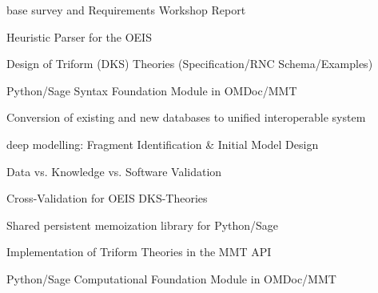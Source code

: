 \begin{workpackage}[id=dksbases,%
  title=Dks/Knowledge/Software-Bases,lead=JU,
  ZHRM=12,JURM=36,USHRM=12,UWRM=25,SARM=10,LLRM=2,PSRM=4]
\begin{wpdelivs}
  \begin{wpdeliv}[due=9,id=wsrep,dissem=PU,nature=R,lead=JU]{\DKS base survey and
      Requirements Workshop Report}
  \end{wpdeliv}
  \begin{wpdeliv}[due=9,id=oeisparser,dissem=PU,nature=OTHER,lead=JU]
      {Heuristic Parser for the OEIS}
  \end{wpdeliv}
  \begin{wpdeliv}[due=12,id=dkstheories,dissem=PU,nature=R,lead=JU]
        {Design of Triform (DKS) Theories (Specification/RNC Schema/Examples)}
  \end{wpdeliv}
  \begin{wpdeliv}[due=12,id=pssyntax,dissem=PU,nature=DEC,lead=JU]
        {Python/Sage Syntax Foundation Module in OMDoc/MMT}
  \end{wpdeliv}
  \begin{wpdeliv}[due=12,id=conv,dissem=PU,nature=DEC,lead=ZH]
        {Conversion of existing and new databases to unified interoperable system}
   \end{wpdeliv}
  \begin{wpdeliv}[due=12,id=lmfmod,dissem=PU,nature=R,lead=ZH]
      {\LMFDB deep modelling: Fragment Identification \& Initial Model Design}
  \end{wpdeliv}
  \begin{wpdeliv}[due=18,id=lmfval,dissem=PU,nature=R,lead=ZH]
      {\LMFDB Data vs. Knowledge vs. Software Validation}
  \end{wpdeliv}
  \begin{wpdeliv}[due=18,id=oeisvalidation,dissem=PU,nature=R,lead=JU]
      {Cross-Validation for OEIS DKS-Theories}
  \end{wpdeliv}
  \begin{wpdeliv}[due=24,id=persistent-memoization,dissem=PU,nature=OTHER,lead=SA]
    {Shared persistent memoization library for Python/Sage} 
  \end{wpdeliv}
  \begin{wpdeliv}[due=24,id=dksimp,dissem=PU,nature=OTHER,lead=JU]
        {Implementation of Triform Theories in the MMT API}
  \end{wpdeliv}
  \begin{wpdeliv}[due=24,id=psfoundation,dissem=PU,nature=OTHER,lead=JU]
        {Python/Sage Computational Foundation Module in OMDoc/MMT}
  \end{wpdeliv}
  \begin{wpdeliv}[due=36,id=pssem,dissem=PU,nature=OTHER,lead=JU]

\end{wpdeliv}
\end{wpdelivs}
\end{workpackage}
